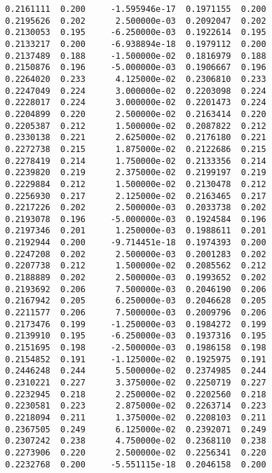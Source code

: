 \documentclass[
  letterpaper,
  DIV=11,
  numbers=noendperiod]{scrartcl}
\begin{document}
\begin{verbatim}
  0.2161111  0.200     -1.595946e-17  0.1971155  0.200           
  0.2195626  0.202      2.500000e-03  0.2092047  0.202           
  0.2130053  0.195     -6.250000e-03  0.1922614  0.195           
  0.2133217  0.200     -6.938894e-18  0.1979112  0.200           
  0.2137489  0.188     -1.500000e-02  0.1816979  0.188           
  0.2150876  0.196     -5.000000e-03  0.1906667  0.196           
  0.2264020  0.233      4.125000e-02  0.2306810  0.233           
  0.2247049  0.224      3.000000e-02  0.2203098  0.224           
  0.2228017  0.224      3.000000e-02  0.2201473  0.224           
  0.2204899  0.220      2.500000e-02  0.2163414  0.220           
  0.2205387  0.212      1.500000e-02  0.2087822  0.212           
  0.2330138  0.221      2.625000e-02  0.2176180  0.221           
  0.2272738  0.215      1.875000e-02  0.2122686  0.215           
  0.2278419  0.214      1.750000e-02  0.2133356  0.214           
  0.2239820  0.219      2.375000e-02  0.2199197  0.219           
  0.2229884  0.212      1.500000e-02  0.2130478  0.212           
  0.2256930  0.217      2.125000e-02  0.2163465  0.217           
  0.2217226  0.202      2.500000e-03  0.2033738  0.202           
  0.2193078  0.196     -5.000000e-03  0.1924584  0.196           
  0.2197346  0.201      1.250000e-03  0.1988611  0.201           
  0.2192944  0.200     -9.714451e-18  0.1974393  0.200           
  0.2247208  0.202      2.500000e-03  0.2001283  0.202           
  0.2207738  0.212      1.500000e-02  0.2085562  0.212           
  0.2188889  0.202      2.500000e-03  0.1993652  0.202           
  0.2193692  0.206      7.500000e-03  0.2046190  0.206           
  0.2167942  0.205      6.250000e-03  0.2046628  0.205           
  0.2211577  0.206      7.500000e-03  0.2009796  0.206           
  0.2173476  0.199     -1.250000e-03  0.1984272  0.199           
  0.2139910  0.195     -6.250000e-03  0.1937316  0.195           
  0.2151695  0.198     -2.500000e-03  0.1986158  0.198           
  0.2154852  0.191     -1.125000e-02  0.1925975  0.191           
  0.2446248  0.244      5.500000e-02  0.2374985  0.244           
  0.2310221  0.227      3.375000e-02  0.2250719  0.227           
  0.2232945  0.218      2.250000e-02  0.2202560  0.218           
  0.2230581  0.223      2.875000e-02  0.2263714  0.223           
  0.2218094  0.211      1.375000e-02  0.2208103  0.211           
  0.2367505  0.249      6.125000e-02  0.2392071  0.249           
  0.2307242  0.238      4.750000e-02  0.2368110  0.238           
  0.2273906  0.220      2.500000e-02  0.2256341  0.220           
  0.2232768  0.200     -5.551115e-18  0.2046158  0.200           

\end{verbatim}
\end{document}
